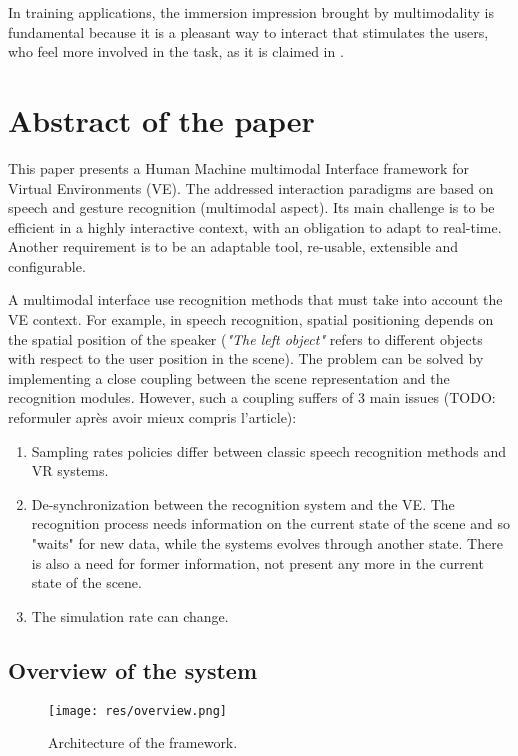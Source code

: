 \documentclass[a4paper]{article}
\begin{document}
In training applications, the immersion impression brought by multimodality is fundamental because it is a pleasant way to interact that stimulates the users, who feel more involved in the task, as it is claimed in \cite{eutap}. 

\section{Abstract of the paper}

This paper presents a Human Machine multimodal Interface framework for Virtual Environments (VE). The addressed interaction paradigms are based on speech and gesture recognition (multimodal aspect). Its main challenge is to be efficient in a highly interactive context, with an obligation to adapt to real-time. Another requirement is to be an adaptable tool, re-usable, extensible and configurable.

A multimodal interface use recognition methods that must take into account the VE context. For example, in speech recognition, spatial positioning depends on the spatial position of the speaker (\textit{"The left object"} refers to different objects with respect to the user position in the scene). The problem can be solved by implementing a close coupling between the scene representation and the recognition modules. However, such a coupling suffers of 3 main issues (TODO: reformuler après avoir mieux compris l'article):
\begin{enumerate}
	\item Sampling rates policies differ between classic speech recognition methods and VR systems.
	\item De-synchronization between the recognition system and the VE. The recognition process needs information on the current state of the scene and so "waits" for new data, while the systems evolves through another state. There is also a need for former information, not present any more in the current state of the scene.
	\item The simulation rate can change.
\end{enumerate}

\subsection{Overview of the system}
\label{sec:overview}
\begin{figure}
\centering
\texttt{[image: res/overview.png]}
\caption{\label{fig:overview}Architecture of the framework.}
\end{figure}
\end{document}
